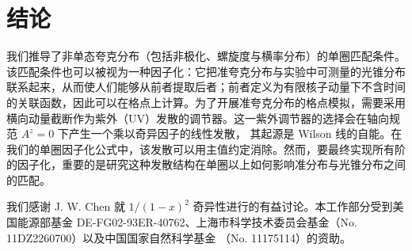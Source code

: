 \section{结论}

我们推导了非单态夸克分布（包括非极化、螺旋度与横率分布）的单圈匹配条件。该匹配条件也可以被视为一种因子化：它把准夸克分布与实验中可测量的光锥分布联系起来，从而使人们能够从前者提取后者；前者定义为有限核子动量下不含时间的关联函数，因此可以在格点上计算。为了开展准夸克分布的格点模拟，需要采用横向动量截断作为紫外（UV）发散的调节器。这一紫外调节器的选择会在轴向规范 $A^z=0$ 下产生一个乘以奇异因子的线性发散，
其起源是 Wilson 线的自能。在我们的单圈因子化公式中，该发散可以用主值约定消除。然而，要最终实现所有阶的因子化，重要的是研究这种发散结构在单圈以上如何影响准分布与光锥分布之间的匹配。

\begin{acknowledgments}
我们感谢 J. W. Chen 就 $1/(1-x)^2$ 奇异性进行的有益讨论。本工作部分受到美国能源部基金
DE-FG02-93ER-40762、上海市科学技术委员会基金（No. 11DZ2260700）以及中国国家自然科学基金
（No. 11175114）的资助。
\end{acknowledgments}
